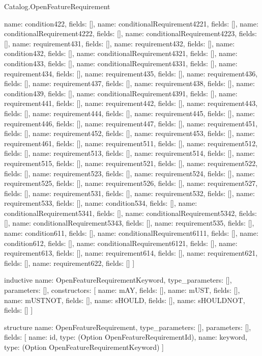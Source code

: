 \begin{lexlean}{Catalog.OpenFeatureRequirement}
\begin{semanticmodule}
{    {name: condition422, fields: []},
    {name: conditionalRequirement4221, fields: []},
    {name: conditionalRequirement4222, fields: []},
    {name: conditionalRequirement4223, fields: []},
    {name: requirement431, fields: []},
    {name: requirement432, fields: []},
    {name: condition432, fields: []},
    {name: conditionalRequirement4321, fields: []},
    {name: condition433, fields: []},
    {name: conditionalRequirement4331, fields: []},
    {name: requirement434, fields: []},
    {name: requirement435, fields: []},
    {name: requirement436, fields: []},
    {name: requirement437, fields: []},
    {name: requirement438, fields: []},
    {name: condition439, fields: []},
    {name: conditionalRequirement4391, fields: []},
    {name: requirement441, fields: []},
    {name: requirement442, fields: []},
    {name: requirement443, fields: []},
    {name: requirement444, fields: []},
    {name: requirement445, fields: []},
    {name: requirement446, fields: []},
    {name: requirement447, fields: []},
    {name: requirement451, fields: []},
    {name: requirement452, fields: []},
    {name: requirement453, fields: []},
    {name: requirement461, fields: []},
    {name: requirement511, fields: []},
    {name: requirement512, fields: []},
    {name: requirement513, fields: []},
    {name: requirement514, fields: []},
    {name: requirement515, fields: []},
    {name: requirement521, fields: []},
    {name: requirement522, fields: []},
    {name: requirement523, fields: []},
    {name: requirement524, fields: []},
    {name: requirement525, fields: []},
    {name: requirement526, fields: []},
    {name: requirement527, fields: []},
    {name: requirement531, fields: []},
    {name: requirement532, fields: []},
    {name: requirement533, fields: []},
    {name: condition534, fields: []},
    {name: conditionalRequirement5341, fields: []},
    {name: conditionalRequirement5342, fields: []},
    {name: conditionalRequirement5343, fields: []},
    {name: requirement535, fields: []},
    {name: condition611, fields: []},
    {name: conditionalRequirement6111, fields: []},
    {name: condition612, fields: []},
    {name: conditionalRequirement6121, fields: []},
    {name: requirement613, fields: []},
    {name: requirement614, fields: []},
    {name: requirement621, fields: []},
    {name: requirement622, fields: []}
  ]
}

inductive{
  name: OpenFeatureRequirementKeyword,
  type_parameters: [],
  parameters: [],
  constructors: [
    {name: mAY, fields: []},
    {name: mUST, fields: []},
    {name: mUSTNOT, fields: []},
    {name: sHOULD, fields: []},
    {name: sHOULDNOT, fields: []}
  ]
}

structure{
  name: OpenFeatureRequirement,
  type_parameters: [],
  parameters: [],
  fields: [
    {name: id, type: (Option OpenFeatureRequirementId)},
    {name: keyword, type: (Option OpenFeatureRequirementKeyword)}
  ]
}
\end{semanticmodule}
\end{lexlean}
